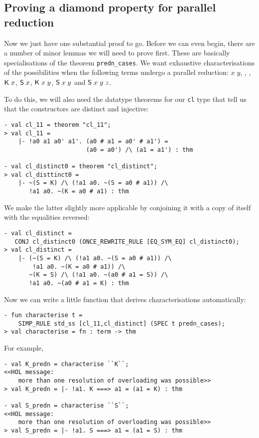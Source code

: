 \documentclass[12pt]{article}
\newcommand{\KC}{\con{K}}
\newcommand{\SC}{\con{S}}
\begin{document}
\subsection{Proving a diamond property for parallel reduction}
\label{sec:predn-diamond}

Now we just have one substantial proof to go.  Before we can even
begin, there are a number of minor lemmas we will need to prove first.
These are basically specialisations of the theorem
\texttt{predn\_cases}.  We want exhaustive characterisations of the
possibilities when the following terms undergo a parallel reduction:
$x\;y$, \KC, \SC, $\KC\;x$, $\SC\;x$, $\KC\;x\;y$, $\SC\;x\;y$ and
$\SC\;x\;y\;z$.

To do this, we will also need the datatype theorems for our
\texttt{cl} type that tell us that the constructors are distinct and
injective:
\begin{session}\begin{verbatim}
- val cl_11 = theorem "cl_11";
> val cl_11 =
    |- !a0 a1 a0' a1'. (a0 # a1 = a0' # a1') =
                       (a0 = a0') /\ (a1 = a1') : thm

- val cl_distinct0 = theorem "cl_distinct";
> val cl_disttinct0 =
    |- ~(S = K) /\ (!a1 a0. ~(S = a0 # a1)) /\
       !a1 a0. ~(K = a0 # a1) : thm
\end{verbatim}\end{session}
We make the latter slightly more applicable by conjoining it with
a copy of itself with the equalities reversed:
\begin{session}\begin{verbatim}
- val cl_distinct =
   CONJ cl_distinct0 (ONCE_REWRITE_RULE [EQ_SYM_EQ] cl_distinct0);
> val cl_distinct =
    |- (~(S = K) /\ (!a1 a0. ~(S = a0 # a1)) /\
        !a1 a0. ~(K = a0 # a1)) /\
       ~(K = S) /\ (!a1 a0. ~(a0 # a1 = S)) /\
       !a1 a0. ~(a0 # a1 = K) : thm
\end{verbatim}\end{session}
    Now we can write a little function that derives characterisations
    automatically:
\begin{session}\begin{verbatim}
- fun characterise t =
    SIMP_RULE std_ss [cl_11,cl_distinct] (SPEC t predn_cases);
> val characterise = fn : term -> thm
\end{verbatim}\end{session}
For example,
\begin{session}\begin{verbatim}
- val K_predn = characterise ``K``;
<<HOL message:
    more than one resolution of overloading was possible>>
> val K_predn = |- !a1. K ===> a1 = (a1 = K) : thm

- val S_predn = characterise ``S``;
<<HOL message:
    more than one resolution of overloading was possible>>
> val S_predn = |- !a1. S ===> a1 = (a1 = S) : thm
\end{verbatim}\end{session}
\end{document}
